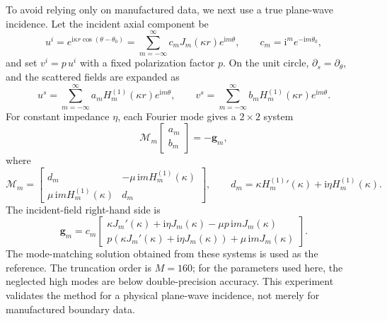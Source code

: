 \documentclass[11pt]{article}
\numberwithin{equation}{section}
\newcommand{\ii}{\mathrm{i}}
\begin{document}
To avoid relying only on manufactured data, we next use a true plane-wave incidence. Let the incident axial component be
\begin{equation}
u^i=e^{\ii\kappa r\cos(\theta-\theta_0)}
=\sum_{m=-\infty}^{\infty}c_mJ_m(\kappa r)e^{\ii m\theta},
\qquad
c_m=\ii^m e^{-\ii m\theta_0},
\end{equation}
and set $v^i=p\,u^i$ with a fixed polarization factor $p$. On the unit circle, $\partial_s=\partial_\theta$, and the scattered fields are expanded as
\begin{equation}
u^s=\sum_{m=-\infty}^{\infty} a_mH_m^{(1)}(\kappa r)e^{\ii m\theta},\qquad
v^s=\sum_{m=-\infty}^{\infty} b_mH_m^{(1)}(\kappa r)e^{\ii m\theta}.
\end{equation}
For constant impedance $\eta$, each Fourier mode gives a $2\times2$ system
\begin{equation}
\mathcal M_m
\begin{bmatrix}a_m\\ b_m\end{bmatrix}
=-\bm g_m,
\end{equation}
where
\begin{equation}
\mathcal M_m=
\begin{bmatrix}
d_m&-\mu\,\ii m H_m^{(1)}(\kappa)\\
\mu\,\ii m H_m^{(1)}(\kappa)&d_m
\end{bmatrix},
\qquad
d_m=\kappa {H_m^{(1)}}'(\kappa)+\ii\eta H_m^{(1)}(\kappa).
\end{equation}
The incident-field right-hand side is
\begin{equation}
\bm g_m=
c_m
\begin{bmatrix}
\kappa J_m'(\kappa)+\ii\eta J_m(\kappa)-\mu p\,\ii m J_m(\kappa)\\
p\left(\kappa J_m'(\kappa)+\ii\eta J_m(\kappa)\right)+\mu\,\ii m J_m(\kappa)
\end{bmatrix}.
\end{equation}
The mode-matching solution obtained from these systems is used as the reference. The truncation order is $M=160$; for the parameters used here, the neglected high modes are below double-precision accuracy. This experiment validates the method for a physical plane-wave incidence, not merely for manufactured boundary data.
\end{document}
